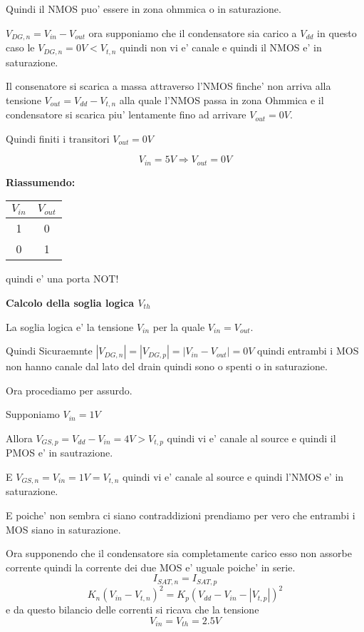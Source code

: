 \documentclass[\main/main.tex]{subfiles}
\begin{document}
Quindi il NMOS puo' essere in zona ohmmica o in saturazione.

$V_{DG,n} = V_{in} - V_{out}$ ora supponiamo che il condensatore sia carico a $V_{dd}$ in questo caso le $V_{DG,n} = 0V < V_{t,n}$ quindi non vi e' canale e quindi il NMOS e' in saturazione.

Il consenatore si scarica a massa attraverso l'NMOS finche' non arriva alla tensione $V_{out} = V_{dd} - V_{t,n}$ alla quale l'NMOS passa in zona Ohmmica e il condensatore si scarica piu' lentamente fino ad arrivare $V_{out} = 0V$.

Quindi finiti i transitori $V_{out} = 0V$

\[V_{in} = 5V \Rightarrow V_{out} = 0V\]

\textbf{Riassumendo:}
\begin{center}
	\begin{tabular}{ c | c }
		$V_{in}$ & $V_{out}$ \\
		\hline
		1        & 0         \\
		0        & 1         \\
	\end{tabular}
\end{center}
quindi e' una porta NOT!


\clearpage
\textbf{Calcolo della soglia logica $V_{th}$}

La soglia logica e' la tensione $V_{in}$ per la quale $V_{in} = V_{out}$.

Quindi Sicuraemnte $|V_{DG,n}| = |V_{DG,p}| = |V_{in} - V_{out}| = 0V$ quindi entrambi i MOS non hanno canale dal lato del drain quindi sono o spenti o in saturazione.

Ora procediamo per assurdo.

Supponiamo $V_{in} = 1V$

Allora $V_{GS,p} = V_{dd} - V_{in} = 4V > V_{t,p}$ quindi vi e' canale al source e quindi il PMOS e' in sautrazione.

E $V_{GS,n} = V_{in} = 1V = V_{t,n}$ quindi vi e' canale al source e quindi l'NMOS e' in saturazione.

E poiche' non sembra ci siano contraddizioni prendiamo per vero che entrambi i MOS siano in saturazione.

Ora supponendo che il condensatore sia completamente carico esso non assorbe corrente quindi la corrente dei due MOS e' uguale poiche' in serie.
\[I_{SAT,n} = I_{SAT,p}\]
\[K_n \left(V_{in} - V_{t,n} \right )^2 = K_p \left(V_{dd} - V_{in} - |V_{t,p}| \right )^2\]
e da questo bilancio delle correnti si ricava che la tensione
\[V_{in} = V_{th} = 2.5V\]
\end{document}
